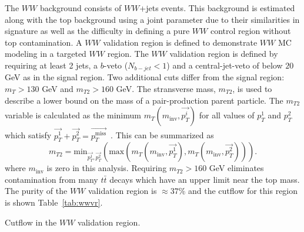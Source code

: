The $WW$ background consists of $WW$+jets events. This background is estimated along with the top background using a joint parameter due to their similarities in signature as well as the difficulty in defining a pure $WW$ control region without top contamination. A $WW$ validation region is defined to demonstrate $WW$ MC modeling in a targeted $WW$ region.  The $WW$ validation region is defined by requiring at least 2 jets, a $b$-veto ($N_{b-jet}<1$) and a central-jet-veto of below $20$ GeV as in the signal region. Two additional cuts differ from the signal region: $m_T>130$ GeV and $m_{T2}>160$ GeV. The stransverse mass, $m_{T2}$, is used to describe a lower bound on the mass of a pair-production parent particle. The $m_{T2}$ variable is calculated as the minimum $m_T(m_{\text{inv}},\vec{p_T^i})$ for all values of $p_T^1$ and $p_T^2$ which satisfy $\vec{p_T^1}+\vec{p_T^2}=\vec{p_T^{\text{miss}}}$~\cite{MT2}. This can be summarized as
\begin{equation}
m_{T2}=\text{min}_{\vec{p_T^1},\vec{p_T^2}}(\text{max}(m_T(m_{\text{inv}},\vec{p_T^1}),m_T(m_{\text{inv}},\vec{p_T^2}))).
\end{equation}
where $m_{\text{inv}}$ is zero in this analysis. Requiring $m_{T2}>160$ GeV eliminates contamination from many $t\bar{t}$ decays which have an upper limit near the top mass. The purity of the $WW$ validation region is $\approx 37\%$ and the cutflow for this region is shown Table~\ref{tab:wwvr}.

\begin{table}[h!]
\centering
\resizebox{\textwidth}{!}{

}
\caption{Cutflow in the $WW$ validation region.}
\label{tab:wwvr}
\end{table}

